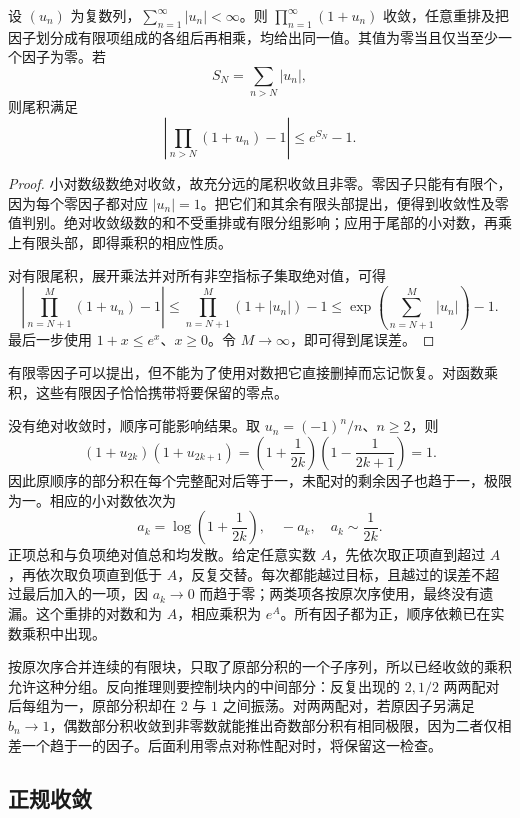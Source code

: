 \begin{proposition}\label{b3:prop:20-absolute-product}
设 \((u_n)\) 为复数列，\(\sum_{n=1}^{\infty}|u_n|<\infty\)。则 \(\prod_{n=1}^{\infty}(1+u_n)\) 收敛，任意重排及把因子划分成有限项组成的各组后再相乘，均给出同一值。其值为零当且仅当至少一个因子为零。若
\[
 S_N=\sum_{n>N}|u_n|,
\]
则尾积满足
\[
 \left|\prod_{n>N}(1+u_n)-1\right|\le e^{S_N}-1.
\]
\end{proposition}
\begin{proof}
小对数级数绝对收敛，故充分远的尾积收敛且非零。零因子只能有有限个，因为每个零因子都对应 \(|u_n|=1\)。把它们和其余有限头部提出，便得到收敛性及零值判别。绝对收敛级数的和不受重排或有限分组影响；应用于尾部的小对数，再乘上有限头部，即得乘积的相应性质。

对有限尾积，展开乘法并对所有非空指标子集取绝对值，可得
\[
 \left|\prod_{n=N+1}^{M}(1+u_n)-1\right|
 \le\prod_{n=N+1}^{M}(1+|u_n|)-1
 \le\exp\left(\sum_{n=N+1}^{M}|u_n|\right)-1.
\]
最后一步使用 \(1+x\le e^x\)、\(x\ge0\)。令 \(M\to\infty\)，即可得到尾误差。
\end{proof}
有限零因子可以提出，但不能为了使用对数把它直接删掉而忘记恢复。对函数乘积，这些有限因子恰恰携带将要保留的零点。

\ProseParagraphBreak

没有绝对收敛时，顺序可能影响结果。取 \(u_n=(-1)^n/n\)、\(n\ge2\)，则
\[
 (1+u_{2k})(1+u_{2k+1})
 =\left(1+\frac1{2k}\right)
  \left(1-\frac1{2k+1}\right)=1.
\]
因此原顺序的部分积在每个完整配对后等于一，未配对的剩余因子也趋于一，极限为一。相应的小对数依次为
\[
 a_k=\log\left(1+\frac1{2k}\right),\quad -a_k,
 \quad a_k\sim\frac1{2k}.
\]
正项总和与负项绝对值总和均发散。给定任意实数 \(A\)，先依次取正项直到超过 \(A\)，再依次取负项直到低于 \(A\)，反复交替。每次都能越过目标，且越过的误差不超过最后加入的一项，因 \(a_k\to0\) 而趋于零；两类项各按原次序使用，最终没有遗漏。这个重排的对数和为 \(A\)，相应乘积为 \(e^A\)。所有因子都为正，顺序依赖已在实数乘积中出现。

\ProseParagraphBreak

按原次序合并连续的有限块，只取了原部分积的一个子序列，所以已经收敛的乘积允许这种分组。反向推理则要控制块内的中间部分：反复出现的 \(2,1/2\) 两两配对后每组为一，原部分积却在 \(2\) 与 \(1\) 之间振荡。对两两配对，若原因子另满足 \(b_n\to1\)，偶数部分积收敛到非零数就能推出奇数部分积有相同极限，因为二者仅相差一个趋于一的因子。后面利用零点对称性配对时，将保留这一检查。

\subsection{正规收敛}
\label{b3:subsec:200103}

